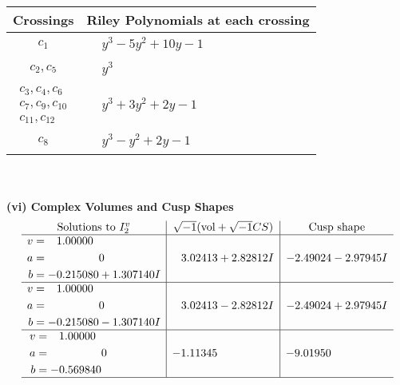 \documentclass[1p]{elsarticle_modified}
\theoremstyle{definition}
\newcommand{\I}{\sqrt{-1}}
\begin{document}
\begin{tabular}{m{50pt}|m{274pt}}
Crossings & \hspace{64pt}Riley Polynomials at each crossing \\
\hline $$\begin{aligned}c_{1}\end{aligned}$$&$\begin{aligned}
&y^3-5 y^2+10 y-1
\end{aligned}$\\
\hline $$\begin{aligned}c_{2},c_{5}\end{aligned}$$&$\begin{aligned}
&y^3
\end{aligned}$\\
\hline $$\begin{aligned}c_{3},c_{4},c_{6}\\c_{7},c_{9},c_{10}\\c_{11},c_{12}\end{aligned}$$&$\begin{aligned}
&y^3+3 y^2+2 y-1
\end{aligned}$\\
\hline $$\begin{aligned}c_{8}\end{aligned}$$&$\begin{aligned}
&y^3- y^2+2 y-1
\end{aligned}$\\
\hline
\end{tabular}\\~\\
\newpage\flushleft \textbf{(vi) Complex Volumes and Cusp Shapes}
$$\begin{array}{c|c|c}  
\text{Solutions to }I^v_{2}& \I (\text{vol} + \sqrt{-1}CS) & \text{Cusp shape}\\
 \hline 
\begin{aligned}
v &= \phantom{-}1.00000\phantom{ +0.000000I} \\
a &= \phantom{-0.000000 } 0 \\
b &= -0.215080 + 1.307140 I\end{aligned}
 & \phantom{-}3.02413 + 2.82812 I & -2.49024 - 2.97945 I \\ \hline\begin{aligned}
v &= \phantom{-}1.00000\phantom{ +0.000000I} \\
a &= \phantom{-0.000000 } 0 \\
b &= -0.215080 - 1.307140 I\end{aligned}
 & \phantom{-}3.02413 - 2.82812 I & -2.49024 + 2.97945 I \\ \hline\begin{aligned}
v &= \phantom{-}1.00000\phantom{ +0.000000I} \\
a &= \phantom{-0.000000 } 0 \\
b &= -0.569840\phantom{ +0.000000I}\end{aligned}
 & -1.11345\phantom{ +0.000000I} & -9.01950\phantom{ +0.000000I}\\
 \hline 
 \end{array}$$\newpage
\end{document}
